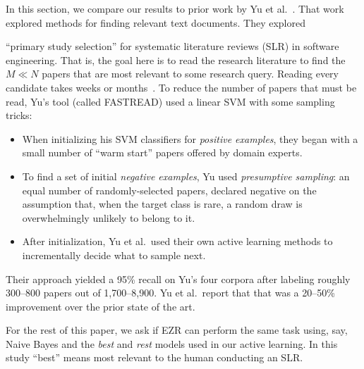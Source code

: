 \documentclass[AMA,STIX2COL]{WileyNJDv5}
\begin{document}
In this section, we compare our results to prior work 
by
Yu et al.~\cite{yu2018total}.
That work
explored methods for 
finding relevant text documents.
They explored  
{``primary study selection'' for
systematic literature reviews (SLR)
in software engineering. 
That is, the goal here is 
to read
the research literature
to find the $M\ll N$
papers that are most relevant
to some research query.
 Reading
every candidate takes weeks or months~\cite{yu2017feature,yu2018}. 
To reduce the number of papers that must be read, Yu's tool 
(called FASTREAD) used a linear SVM with
some sampling tricks:
\begin{itemize}
\item 
When initializing his SVM classifiers for {\em positive examples},
they began with a small number of ``warm start'' papers offered by domain experts. 

\item To
find a set of initial {\em negative examples}, Yu used {\em presumptive sampling}:
  an equal number of randomly-selected papers, declared negative on
  the assumption that, when the target class is rare, a random draw
  is overwhelmingly unlikely to belong to it.
  \item After initialization, Yu et al.\ used their own active learning
  methods to incrementally decide what to sample next.
\end{itemize}
Their approach yielded a 95\% recall on Yu's four corpora after labeling
roughly 300--800 papers out of 1,700--8,900. 
Yu et al.\ report that that was a
20--50\% improvement over the prior state of the
art.

For the rest of this paper,  we  ask if EZR can perform the same task using, say,
Naive Bayes and the {\em best} and {\em rest} models
used in our active learning.  
In this study ``best'' means most relevant to the human conducting an SLR.

}
\end{document}
